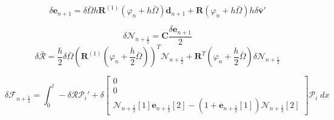 \documentclass{article}
\newcommand{\dep}[1]{{\scriptstyle(#1)}}
\begin{document}
$$\delta\mathbf{e}_{n+1} = \delta\bar{\Omega} h \mathbf{R}^{(1)}\dep{\varphi_n+h\bar{\Omega}}\mathbf{d}_{n+1} + \mathbf{R}\dep{\varphi_n+h\bar{\Omega}}h\delta\bar{\mathbf{v}}'$$

$$ \delta \mathcal{N}_{n+\frac{1}{2}} = \mathbf{C}\frac{\delta\mathbf{e}_{n+1}}{2}$$
$$ \delta\bar{\mathcal{R}} = \frac{h}{2}\delta\bar{\Omega}(\mathbf{R}^{(1)}\dep{\varphi_n+\frac{h}{2}\bar{\Omega}})^T\mathcal{N}_{n+\frac{1}{2}} + \mathbf{R}^T\dep{\varphi_n+\frac{h}{2}\bar{\Omega}}\delta\mathcal{N}_{n+\frac{1}{2}}$$ 

$$\delta \mathcal{F}_{n+\frac{1}{2}} = \int_0^l- \delta \mathcal{RP}_i' + \delta{\scriptscriptstyle \begin{bmatrix} 0 \\ 0 \\ \mathcal{N}_{n+\frac{1}{2}}[1]\mathbf{e}_{n+\frac{1}{2}}[2] - (1+\mathbf{e}_{n+\frac{1}{2}}[1])\mathcal{N}_{n+\frac{1}{2}}[2] \end{bmatrix}}\mathcal{P}_i\; dx$$
\end{document}
